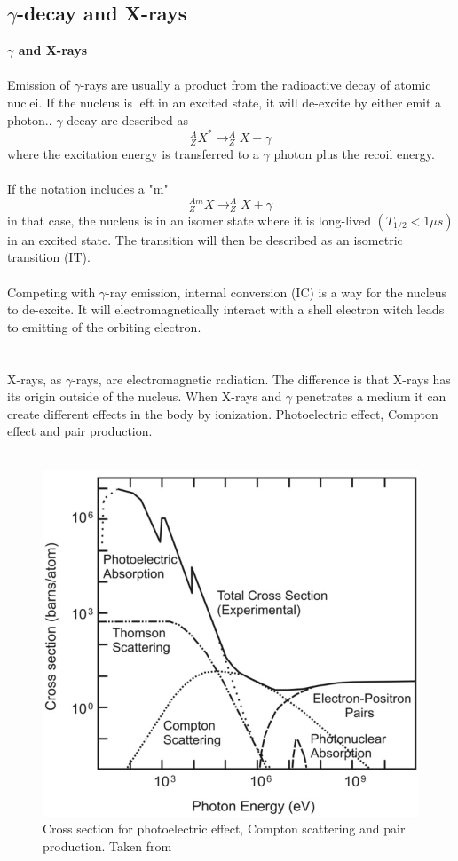 \documentclass[twoside,english]{uiofysmaster/uiofysmaster}
\begin{document}
\subsection{$\gamma$-decay and X-rays}

\textbf{$\gamma$ and X-rays}\\
\\
\noindent
Emission of $\gamma$-rays are usually a product from the radioactive decay of atomic nuclei. If the nucleus is left in an excited state, it will de-excite by either emit a photon.\cite{nuclearchem}. $\gamma$ decay are described as $$^{A}_{Z}X^* \rightarrow ^{A}_ZX + \gamma$$
where the excitation energy is transferred to a $\gamma$ photon plus the recoil energy.\\
\\
If the notation includes a "m" $$^{Am}_ZX \rightarrow ^{A}_ZX + \gamma$$
in that case, the nucleus is in an isomer state where it is long-lived $(T_{1/2} < 1 \mu s)$ in an excited state\cite{nuclearchem}. The transition will then be described as an isometric transition (IT).\\
\\
Competing with $\gamma$-ray emission, internal conversion (IC) is a way for the nucleus to de-excite. It will electromagnetically interact with a shell electron witch leads to emitting of the orbiting electron\cite{toxicology}.\\
\\
\\  
X-rays, as $\gamma$-rays, are electromagnetic radiation. The difference is that X-rays has its origin outside of the nucleus. When X-rays and $\gamma$ penetrates a medium it can create different effects in the body by ionization.
Photoelectric effect, Compton effect and pair production. \\
\\
\begin{figure}[h!]
    \centering
     \includegraphics[scale=0.4]{pcp_cross.png}
     \caption{Cross section for photoelectric effect, Compton scattering and pair production. Taken from \cite{photoelectric_cross} }
    \label{fig:photo-compton-pair}
\end{figure}
\end{document}

